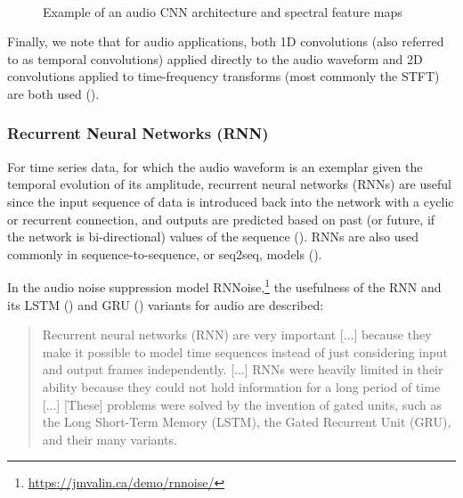 \documentclass[report.tex]{subfiles}
\begin{document}
\begin{figure}[ht]
	\centering
	\\
	\caption{Example of an audio CNN architecture and spectral feature maps}
	\label{fig:audiocnn}
\end{figure}

Finally, we note that for audio applications, both 1D convolutions (also referred to as temporal convolutions) applied directly to the audio waveform and 2D convolutions applied to time-frequency transforms (most commonly the STFT) are both used (\cite{tcn, 2dconv}).

\subsubsection{Recurrent Neural Networks (RNN)}

For time series data, for which the audio waveform is an exemplar given the temporal evolution of its amplitude, recurrent neural networks (RNNs) are useful since the input sequence of data is introduced back into the network with a cyclic or recurrent connection, and outputs are predicted based on past (or future, if the network is bi-directional) values of the sequence (\cite{rnns}). RNNs are also used commonly in sequence-to-sequence, or seq2seq, models (\cite{seq2seqs}).

In the audio noise suppression model RNNoise,\footnote{\url{https://jmvalin.ca/demo/rnnoise/}} the usefulness of the RNN and its LSTM (\cite{lstm1}) and GRU (\cite{gru1}) variants for audio are described:

\begin{quote}
	Recurrent neural networks (RNN) are very important [...] because they make it possible to model time sequences instead of just considering input and output frames independently. [...] RNNs were heavily limited in their ability because they could not hold information for a long period of time [...] [These] problems were solved by the invention of gated units, such as the Long Short-Term Memory (LSTM), the Gated Recurrent Unit (GRU), and their many variants.
\end{quote}
\end{document}
